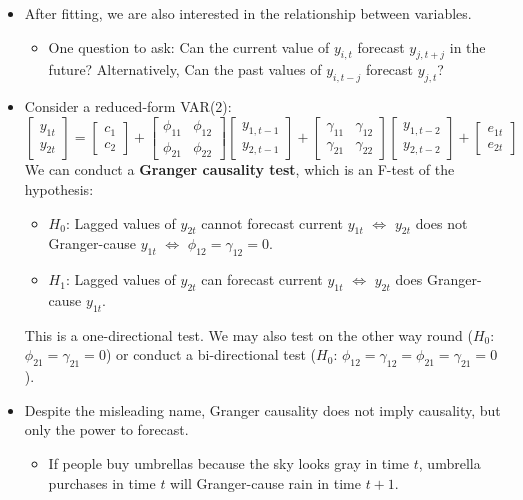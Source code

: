 \documentclass[notitlepage]{article}
\begin{document}
\begin{itemize}
    \item After fitting, we are also interested in the relationship between variables.
    \begin{itemize}
        \item One question to ask: Can the current value of \(y_{i,t}\) forecast \(y_{j,t+j}\) in the future? Alternatively, Can the past values of \(y_{i,t-j}\) forecast \(y_{j,t}\)?
    \end{itemize}
    \item Consider a reduced-form VAR(2):
    \[
    \begin{bmatrix}
        y_{1t} \\ y_{2t}
    \end{bmatrix} =
    \begin{bmatrix}
        c_1 \\ c_2
    \end{bmatrix} +
    \begin{bmatrix}
        \phi_{11} & \phi_{12} \\ \phi_{21} & \phi_{22}
    \end{bmatrix}
    \begin{bmatrix}
        y_{1,t-1} \\ y_{2,t-1}
    \end{bmatrix} +
    \begin{bmatrix}
        \gamma_{11} & \gamma_{12} \\ \gamma_{21} & \gamma_{22}
    \end{bmatrix}
    \begin{bmatrix}
        y_{1,t-2} \\ y_{2,t-2}
    \end{bmatrix} +
    \begin{bmatrix}
        e_{1t} \\ e_{2t}
    \end{bmatrix}
    \]
    We can conduct a \textbf{Granger causality test}, which is an F-test of the hypothesis:
    \begin{itemize}
        \item \(H_0\): Lagged values of \(y_{2t}\) cannot forecast current \(y_{1t}\) \(\iff\) \(y_{2t}\) does not Granger-cause \(y_{1t}\) \(\iff\) \(\phi_{12} = \gamma_{12} = 0\).
        \item \(H_1\): Lagged values of \(y_{2t}\) can forecast current \(y_{1t}\) \(\iff\) \(y_{2t}\) does Granger-cause \(y_{1t}\).
    \end{itemize}
    This is a one-directional test. We may also test on the other way round (\(H_0\): \(\phi_{21} = \gamma_{21} = 0\)) or conduct a bi-directional test (\(H_0\): \(\phi_{12} = \gamma_{12} = \phi_{21} = \gamma_{21} = 0\)).
    \item Despite the misleading name, Granger causality does not imply causality, but only the power to forecast.
    \begin{itemize}
        \item If people buy umbrellas because the sky looks gray in time \(t\), umbrella purchases in time \(t\) will Granger-cause rain in time \(t+1\).
    \end{itemize}
\end{itemize}
\end{document}
